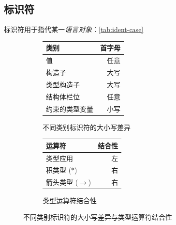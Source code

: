 \documentclass[a4paper, 11pt]{article}
\theoremstyle{remark}\newtheorem*{remark}{Remark}
\theoremstyle{definition}\newtheorem*{definition}{Definition}
\begin{document}
\subsection{标识符}
标识符用于指代某一\emph{语言对象}：\autoref{tab:ident-case}
\begin{figure}
  \centering
  \begin{subfigure}{0.5\textwidth}\centering
    \begin{tabular}{@{}lr@{}}
      \toprule
      类别             & 首字母 \\ \midrule
      值               & 任意          \\
      构造子         & 大写    \\
      类型构造子    & 大写    \\
      结构体栏位        & 任意          \\
      约束的类型变量 & 小写    \\ \bottomrule
    \end{tabular}
    \caption{不同类别标识符的大小写差异}\label{tab:ident-case}
  \end{subfigure}%
  \begin{subfigure}{0.5\textwidth}\centering
    \begin{tabular}{@{}lr@{}}
      \toprule
      运算符                     & 结合性 \\ \midrule
      类型应用             & 左         \\
      积类型 (\(\ast\))             & 右         \\
      箭头类型 (\(\to\)) & 右 \\ \bottomrule
    \end{tabular}
    \caption{类型运算符结合性}\label{tab:tyoperator-prec}
  \end{subfigure}
  \caption{不同类别标识符的大小写差异与类型运算符结合性}
\end{figure}
\end{document}
